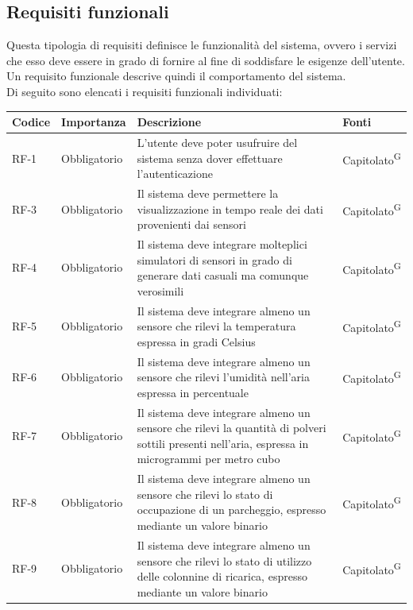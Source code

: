 \documentclass[8pt]{article}
\newcommand{\glossterm}[1]{#1\textsuperscript{G}} %
\begin{document}
\subsection{Requisiti funzionali}
Questa tipologia di requisiti definisce le funzionalità del sistema, ovvero i servizi che esso deve essere in grado di fornire al fine di soddisfare le esigenze dell'utente. Un requisito funzionale descrive quindi il comportamento del sistema. \\ Di seguito sono elencati i requisiti funzionali individuati:
\renewcommand{\arraystretch}{1.25}
\begin{longtable}{p{1.2cm} p{2cm} p{8cm} p{3cm}}
    \toprule
	\textbf{Codice} & \textbf{Importanza} & \textbf{Descrizione} & \textbf{Fonti}\\
		\midrule
            RF-1 & Obbligatorio & L'utente deve poter usufruire del sistema senza dover effettuare l'autenticazione & \glossterm{Capitolato} \\
            RF-3 & Obbligatorio & Il sistema deve permettere la visualizzazione in tempo reale dei dati provenienti dai sensori & \glossterm{Capitolato} \\
            RF-4 & Obbligatorio & Il sistema deve integrare molteplici simulatori di sensori in grado di generare dati casuali ma comunque verosimili & \glossterm{Capitolato} \\
            RF-5 & Obbligatorio & Il sistema deve integrare almeno un sensore che rilevi la temperatura espressa in gradi Celsius & \glossterm{Capitolato} \\
            RF-6 & Obbligatorio & Il sistema deve integrare almeno un sensore che rilevi l'umidità nell'aria espressa in percentuale & \glossterm{Capitolato} \\
            RF-7 & Obbligatorio & Il sistema deve integrare almeno un sensore che rilevi la quantità di polveri sottili presenti nell'aria, espressa in microgrammi per metro cubo & \glossterm{Capitolato} \\
            RF-8 & Obbligatorio & Il sistema deve integrare almeno un sensore che rilevi lo stato di occupazione di un parcheggio, espresso mediante un valore binario & \glossterm{Capitolato} \\
            RF-9 & Obbligatorio & Il sistema deve integrare almeno un sensore che rilevi lo stato di utilizzo delle colonnine di ricarica, espresso mediante un valore binario & \glossterm{Capitolato} \\

\end{longtable}
\end{document}
